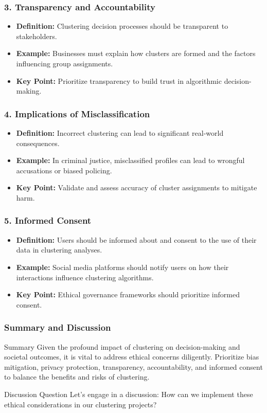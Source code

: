 \documentclass[aspectratio=169]{beamer}
\begin{document}
\begin{frame}[fragile]
    \frametitle{3. Transparency and Accountability}
    \begin{itemize}
        \item \textbf{Definition:} Clustering decision processes should be transparent to stakeholders.
        \item \textbf{Example:} Businesses must explain how clusters are formed and the factors influencing group assignments.
        \item \textbf{Key Point:} Prioritize transparency to build trust in algorithmic decision-making.
    \end{itemize}
\end{frame}

\begin{frame}[fragile]
    \frametitle{4. Implications of Misclassification}
    \begin{itemize}
        \item \textbf{Definition:} Incorrect clustering can lead to significant real-world consequences.
        \item \textbf{Example:} In criminal justice, misclassified profiles can lead to wrongful accusations or biased policing.
        \item \textbf{Key Point:} Validate and assess accuracy of cluster assignments to mitigate harm.
    \end{itemize}
\end{frame}

\begin{frame}[fragile]
    \frametitle{5. Informed Consent}
    \begin{itemize}
        \item \textbf{Definition:} Users should be informed about and consent to the use of their data in clustering analyses.
        \item \textbf{Example:} Social media platforms should notify users on how their interactions influence clustering algorithms.
        \item \textbf{Key Point:} Ethical governance frameworks should prioritize informed consent.
    \end{itemize}
\end{frame}

\begin{frame}[fragile]
    \frametitle{Summary and Discussion}
    \begin{block}{Summary}
        Given the profound impact of clustering on decision-making and societal outcomes, it is vital to address ethical concerns diligently. 
        Prioritize bias mitigation, privacy protection, transparency, accountability, and informed consent to balance the benefits and risks of clustering.
    \end{block}
    \begin{block}{Discussion Question}
        Let's engage in a discussion: How can we implement these ethical considerations in our clustering projects?
    \end{block}
\end{frame}
\end{document}

